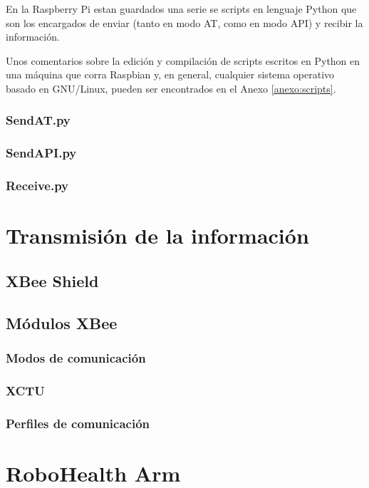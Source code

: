 En la Raspberry Pi estan guardados una serie se scripts en lenguaje Python que son los encargados de enviar (tanto en modo AT, como en modo API) y recibir la información.

Unos comentarios sobre la edición y compilación de scripts escritos en Python en una máquina que corra Raspbian y, en general, cualquier sistema operativo basado en GNU/Linux, pueden ser encontrados en el Anexo \ref{anexo:scripts}.

\subsubsection{SendAT.py}

\subsubsection{SendAPI.py}

\subsubsection{Receive.py}


\section{Transmisión de la información}

\subsection{XBee Shield}

\subsection{Módulos XBee}

\subsubsection{Modos de comunicación}

\subsubsection{XCTU}

\subsubsection{Perfiles de comunicación}


\section{RoboHealth Arm}

